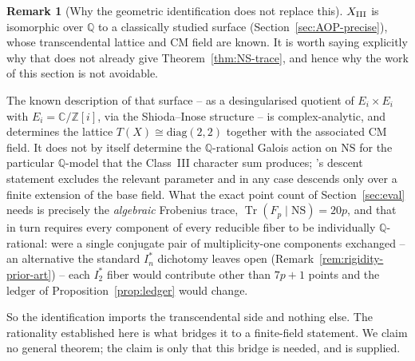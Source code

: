 \documentclass[11pt]{amsart}
\theoremstyle{definition}
\newtheorem{remark}[theorem]{Remark}
\newcommand{\Q}{\mathbb{Q}}
\newcommand{\Z}{\mathbb{Z}}
\newcommand{\NS}{\mathrm{NS}}
\DeclareMathOperator{\Tr}{Tr}
\begin{document}
\begin{remark}[Why the geometric identification does not replace this]
\label{rem:why-not-automatic}
$X_{\rm III}$ is isomorphic over $\Q$ to a classically studied surface
(Section~\ref{sec:AOP-precise}), whose transcendental lattice and CM
field are known. It is worth saying explicitly why that does not already
give Theorem~\ref{thm:NS-trace}, and hence why the work of this section
is not avoidable.

The known description of that surface -- as a desingularised quotient of
$E_i\times E_i$ with $E_i=\mathbb{C}/\Z[i]$, via the Shioda--Inose
structure -- is complex-analytic, and determines the lattice
$T(X)\cong\mathrm{diag}(2,2)$ together with the associated CM field. It
does not by itself determine the $\Q$-rational Galois action on
$\NS$ for the particular $\Q$-model that the Class~III character sum
produces; \cite{vanGeemenTop2006}'s descent statement excludes the
relevant parameter and in any case descends only over a finite extension
of the base field. What the exact point count of
Section~\ref{sec:eval} needs is precisely the \emph{algebraic} Frobenius
trace, $\Tr(F_p\mid\NS)=20p$, and that in turn requires every component
of every reducible fiber to be individually $\Q$-rational: were a single
conjugate pair of multiplicity-one components exchanged -- an alternative
the standard $I_n^*$ dichotomy leaves open
(Remark~\ref{rem:rigidity-prior-art}) -- each $I_2^*$ fiber would
contribute other than $7p+1$ points and the ledger of
Proposition~\ref{prop:ledger} would change.

So the identification imports the transcendental side and nothing else.
The rationality established here is what bridges it to a finite-field
statement. We claim no general theorem; the claim is only that this
bridge is needed, and is supplied.
\end{remark}
\end{document}
